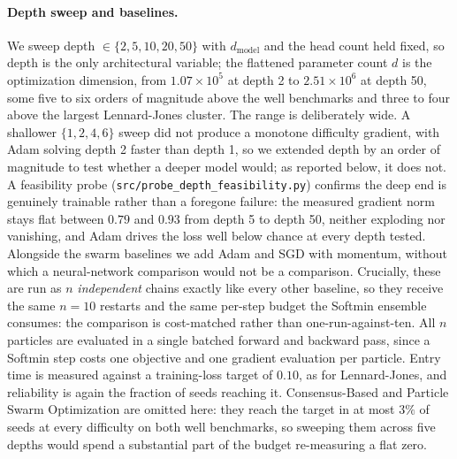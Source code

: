 \documentclass{article} %
\theoremstyle{plain}
\theoremstyle{definition}
\theoremstyle{remark}
\begin{document}
\paragraph{Depth sweep and baselines.} We sweep depth $\in\{2,5,10,20,50\}$ with $d_{\text{model}}$ and the head count held fixed, so
depth is the only architectural variable; the flattened parameter count $d$ is the optimization
dimension, from $1.07\times10^5$ at depth 2 to $2.51\times10^6$ at depth 50, some five to six orders
of magnitude above the well benchmarks and three to four above the largest Lennard-Jones cluster. The range is
deliberately wide. A shallower $\{1,2,4,6\}$ sweep did not produce a monotone difficulty gradient,
with Adam solving depth 2 faster than depth 1, so we extended depth by an order of magnitude to
test whether a deeper model would; as reported below, it does not. A feasibility probe
(\texttt{src/probe\_depth\_feasibility.py}) confirms the deep end is genuinely trainable rather
than a foregone failure: the measured gradient norm stays flat between $0.79$ and $0.93$ from
depth 5 to depth 50, neither exploding nor vanishing, and Adam drives the loss well below chance
at every depth tested. Alongside the swarm baselines we add Adam \citep{kingma2014adam} and SGD
with momentum, without which a neural-network comparison would not be a comparison. Crucially,
these are run as $n$ \emph{independent} chains exactly like every other baseline, so they receive
the same $n=10$ restarts and the same per-step budget the Softmin ensemble consumes: the
comparison is cost-matched rather than one-run-against-ten. All $n$ particles are evaluated in a
single batched forward and backward pass, since a Softmin step costs one objective and one
gradient evaluation per particle. Entry time is measured against a training-loss target of
$0.10$, as for Lennard-Jones, and reliability is again the fraction of seeds reaching it. Consensus-Based and
Particle Swarm Optimization are omitted here: they reach the target in at most $3\%$ of seeds at every
difficulty on both well benchmarks, so sweeping them across five depths would spend a substantial part
of the budget re-measuring a flat zero.
\end{document}
